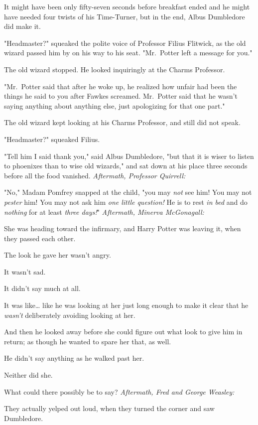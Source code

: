 It might have been only fifty-seven seconds before breakfast ended and he might 
have needed four twists of his Time-Turner, but in the end, Albus Dumbledore 
did make it.

"Headmaster?" squeaked the polite voice of Professor Filius Flitwick, as the 
old wizard passed him by on his way to his seat. "Mr.~Potter left a message for 
you."

The old wizard stopped. He looked inquiringly at the Charms Professor.

"Mr.~Potter said that after he woke up, he realized how unfair had been the 
things he said to you after Fawkes screamed. Mr.~Potter said that he wasn't 
saying anything about anything else, just apologizing for that one part."

The old wizard kept looking at his Charms Professor, and still did not speak.

"Headmaster?" squeaked Filius.

"Tell him I said thank you," said Albus Dumbledore, "but that it is wiser to 
listen to phoenixes than to wise old wizards," and sat down at his place three 
seconds before all the food vanished.
\sbreak
\emph{Aftermath, Professor Quirrell:}

"No," Madam Pomfrey snapped at the child, "you may \emph{not} see him! You may 
not \emph{pester} him! You may not ask him\emph{ one little question!} He is to 
rest \emph{in bed} and do \emph{nothing} for at least \emph{three days!}"
\sbreak
\emph{Aftermath, Minerva McGonagall:}

She was heading toward the infirmary, and Harry Potter was leaving it, when 
they passed each other.

The look he gave her wasn't angry.

It wasn't sad.

It didn't say much at all.

It was like{\ldots} like he was looking at her just long enough to make it 
clear that he \emph{wasn't} deliberately avoiding looking at her.

And then he looked away before she could figure out what look to give him in 
return; as though he wanted to spare her that, as well.

He didn't say anything as he walked past her.

Neither did she.

What could there possibly be to say?
\sbreak
\emph{Aftermath, Fred and George Weasley:}

They actually yelped out loud, when they turned the corner and saw Dumbledore.

